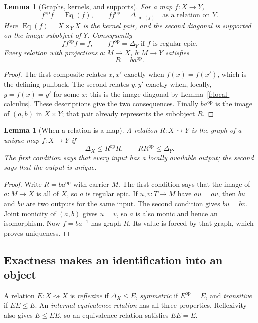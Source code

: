 \documentclass[11pt]{article}
\newtheorem{lemma}[theorem]{Lemma}
\theoremstyle{definition}
\theoremstyle{remark}\newtheorem{remark}[theorem]{Remark}
\DeclareMathOperator{\im}{im}
\begin{document}
\begin{lemma}[Graphs, kernels, and supports]\label{f:graph-kernel}
For a map $f:X\to Y$,
\[
f^{\mathrm{op}}f=\operatorname{Eq}(f),
\qquad
ff^{\mathrm{op}}=\Delta_{\im(f)}
\quad\text{as a relation on }Y.
\]
Here $\operatorname{Eq}(f)=X\times_YX$ is the kernel pair, and the second
diagonal is supported on the image subobject of $Y$. Consequently
\[
ff^{\mathrm{op}}f=f,
\qquad ff^{\mathrm{op}}=\Delta_Y
\text{ if }f\text{ is regular epic}.
\]
Every relation with projections $a:M\to X$, $b:M\to Y$ satisfies
\[
R=ba^{\mathrm{op}}.
\]
\end{lemma}
\begin{proof}
The first composite relates $x,x'$ exactly when $f(x)=f(x')$, which is
the defining pullback. The second relates $y,y'$ exactly when, locally,
$y=f(x)=y'$ for some $x$; this is the image diagonal by
Lemma~\ref{f:local-calculus}. These descriptions give the two
consequences. Finally $ba^{\mathrm{op}}$ is the image of $(a,b)$ in
$X\times Y$; that pair already represents the subobject $R$.
\end{proof}

\begin{lemma}[When a relation is a map]\label{f:functional}
A relation $R:X\rightsquigarrow Y$ is the graph of a unique map
$f:X\to Y$ if
\[
\Delta_X\leq R^{\mathrm{op}}R,
\qquad RR^{\mathrm{op}}\leq\Delta_Y.
\]
The first condition says that every input has a locally available
output; the second says that the output is unique.
\end{lemma}
\begin{proof}
Write $R=ba^{\mathrm{op}}$ with carrier $M$. The first condition says
that the image of $a:M\to X$ is all of $X$, so $a$ is regular epic.
If $u,v:T\to M$ have $au=av$, then $bu$ and $bv$ are two outputs for
the same input. The second condition gives $bu=bv$. Joint monicity
of $(a,b)$ gives $u=v$, so $a$ is also monic and hence an isomorphism.
Now $f=ba^{-1}$ has graph $R$. Its value is forced by that graph,
which proves uniqueness.
\end{proof}

\subsection{Exactness makes an identification into an object}

A relation $E:X\rightsquigarrow X$ is \emph{reflexive} if
$\Delta_X\leq E$, \emph{symmetric} if $E^{\mathrm{op}}=E$, and
\emph{transitive} if $EE\leq E$. An \emph{internal equivalence relation}
has all three properties. Reflexivity also gives $E\leq EE$, so an
equivalence relation satisfies $EE=E$.
\end{document}
